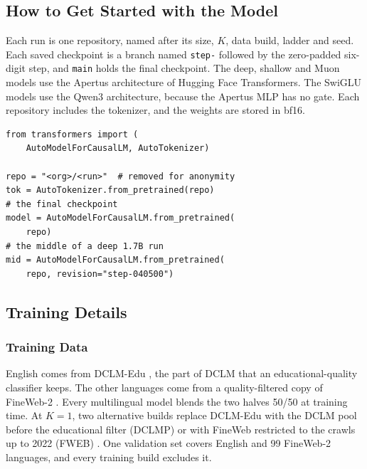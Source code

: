 \subsection*{How to Get Started with the Model}

Each run is one repository, named after its size, $K$, data build, ladder and seed. Each saved checkpoint is a branch named \texttt{step-} followed by the zero-padded six-digit step, and \texttt{main} holds the final checkpoint. The deep, shallow and Muon models use the Apertus architecture of Hugging Face Transformers. The SwiGLU models use the Qwen3 architecture, because the Apertus MLP has no gate. Each repository includes the tokenizer, and the weights are stored in bf16.

\begin{small}
\begin{verbatim}
from transformers import (
    AutoModelForCausalLM, AutoTokenizer)

repo = "<org>/<run>"  # removed for anonymity
tok = AutoTokenizer.from_pretrained(repo)
# the final checkpoint
model = AutoModelForCausalLM.from_pretrained(
    repo)
# the middle of a deep 1.7B run
mid = AutoModelForCausalLM.from_pretrained(
    repo, revision="step-040500")
\end{verbatim}
\end{small}

\subsection*{Training Details}

\subsubsection*{Training Data}

English comes from DCLM-Edu \citep{allal_smollm2_2025}, the part of DCLM \citep{li_datacomp-lm_2025} that an educational-quality classifier \citep{lozhkov_fineweb-edu_2024} keeps. The other languages come from a quality-filtered copy of FineWeb-2 \citep{penedo_fineweb2_2025,messmer_enhancing_2026}. Every multilingual model blends the two halves 50/50 at training time. At $K=1$, two alternative builds replace DCLM-Edu with the DCLM pool before the educational filter (DCLMP) or with FineWeb restricted to the crawls up to 2022 (FWEB) \citep{penedo_fineweb_2024}. One validation set covers English and 99 FineWeb-2 languages, and every training build excludes it.

